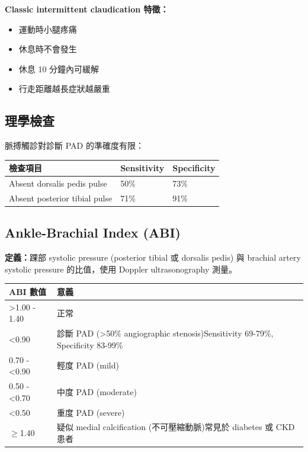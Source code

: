 \documentclass[12pt,a4paper]{article}
\begin{document}
\textbf{Classic intermittent claudication 特徵：}
\begin{itemize}[leftmargin=2em]
    \item 運動時小腿疼痛
    \item 休息時不會發生
    \item 休息 10 分鐘內可緩解
    \item 行走距離越長症狀越嚴重
\end{itemize}

\subsection{理學檢查}

脈搏觸診對診斷 PAD 的準確度有限：

\begin{longtable}{p{5cm}p{3cm}p{3cm}}
\toprule
\textbf{檢查項目} & \textbf{Sensitivity} & \textbf{Specificity} \\
\midrule
\endfirsthead
Absent dorsalis pedis pulse & 50\% & 73\% \\
\midrule
Absent posterior tibial pulse & 71\% & 91\% \\
\bottomrule
\end{longtable}

\subsection{Ankle-Brachial Index (ABI)}

\textbf{定義：}踝部 systolic pressure (posterior tibial 或 dorsalis pedis) 與 brachial artery systolic pressure 的比值，使用 Doppler ultrasonography 測量。

\begin{longtable}{p{4cm}p{10cm}}
\toprule
\textbf{ABI 數值} & \textbf{意義} \\
\midrule
\endfirsthead
>1.00 - 1.40 & 正常 \\
\midrule
<0.90 & 診斷 PAD (>50\% angiographic stenosis)\newline Sensitivity 69-79\%, Specificity 83-99\% \\
\midrule
0.70 - <0.90 & 輕度 PAD (mild) \\
\midrule
0.50 - <0.70 & 中度 PAD (moderate) \\
\midrule
<0.50 & 重度 PAD (severe) \\
\midrule
$\geq$1.40 & 疑似 medial calcification (不可壓縮動脈)\newline 常見於 diabetes 或 CKD 患者 \\
\bottomrule
\end{longtable}
\end{document}
